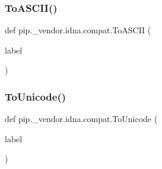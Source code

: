 \subsubsection{\texorpdfstring{To\+A\+S\+C\+I\+I()}{ToASCII()}}
{\footnotesize\ttfamily def pip.\+\_\+vendor.\+idna.\+compat.\+To\+A\+S\+C\+II (\begin{DoxyParamCaption}\item[{}]{label }\end{DoxyParamCaption})}

\mbox{\label{namespacepip_1_1__vendor_1_1idna_1_1compat_a38f5a4547daa72377903b73d2877b642}} 
\subsubsection{\texorpdfstring{To\+Unicode()}{ToUnicode()}}
{\footnotesize\ttfamily def pip.\+\_\+vendor.\+idna.\+compat.\+To\+Unicode (\begin{DoxyParamCaption}\item[{}]{label }\end{DoxyParamCaption})}

